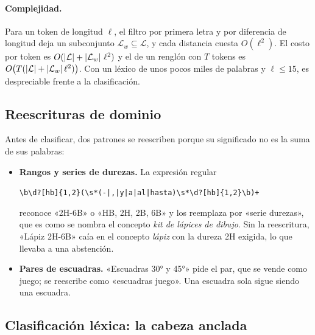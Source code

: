 \paragraph{Complejidad.} Para un token de longitud $\ell$, el filtro por
primera letra y por diferencia de longitud deja un subconjunto
$\mathcal{L}_w\subseteq\mathcal{L}$, y cada distancia cuesta
$O(\ell^2)$. El costo por token es $O(\left\lvert \mathcal{L} \right\rvert+\left\lvert \mathcal{L}_w \right\rvert\,\ell^2)$
y el de un renglón con $T$ tokens es $O\bigl(T(\left\lvert \mathcal{L} \right\rvert+\left\lvert \mathcal{L}_w \right\rvert\ell^2)\bigr)$.
Con un léxico de unos pocos miles de palabras y $\ell\leq 15$, es
despreciable frente a la clasificación.

\subsection{Reescrituras de dominio}
\label{sec:res-reescrituras}

Antes de clasificar, dos patrones se reescriben porque su significado no es
la suma de sus palabras:
\begin{itemize}
  \item \textbf{Rangos y series de durezas.} La expresión regular
        \begin{center}\small\verb!\b\d?[hb]{1,2}(\s*(-|,|y|a|al|hasta)\s*\d?[hb]{1,2}\b)+!\end{center}
        reconoce «2H-6B» o «HB, 2H, 2B, 6B» y los reemplaza por «serie
        durezas», que es como se nombra el concepto \emph{kit de lápices de
        dibujo}. Sin la reescritura, «Lápiz 2H-6B» caía en el concepto
        \emph{lápiz} con la dureza 2H exigida, lo que llevaba a una abstención.
  \item \textbf{Pares de escuadras.} «Escuadras 30° y 45°» pide el par, que se
        vende como juego; se reescribe como «escuadras juego». Una escuadra
        sola sigue siendo una escuadra.
\end{itemize}

\subsection{Clasificación léxica: la cabeza anclada}
\label{sec:res-lexico}

